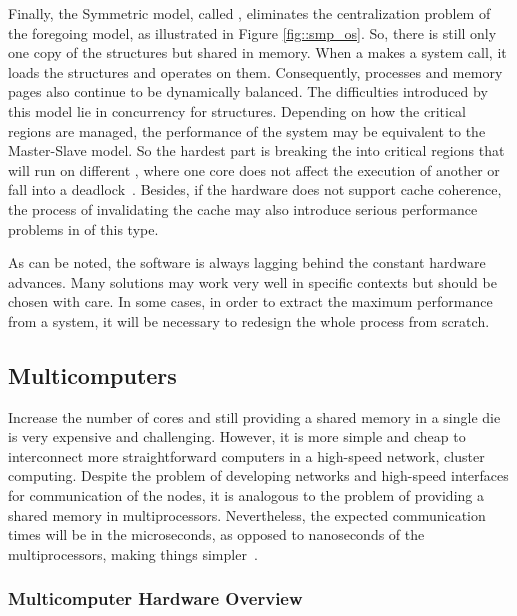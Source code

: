 			Finally, the Symmetric model, called \smp, eliminates the centralization
			problem of the foregoing model, as illustrated in Figure \ref{fig::smp_os}.
			So, there is still only one copy of the \os structures but shared in memory.
			When a \cpu makes a system call, it loads the structures and operates on them.
			Consequently, processes and memory pages also continue to be dynamically balanced.
			The difficulties introduced by this model lie in concurrency for \os structures.
			Depending on how the critical regions are managed, the performance of the system
			may be equivalent to the Master-Slave model. So the hardest part is breaking the
			\os into critical regions that will run on different \cpus, where one core does
			not affect the execution of another or fall into a deadlock~\cite{tanenbaum:4ed}.
			Besides, if the hardware does not support cache coherence, the process of
			invalidating the cache may also introduce serious performance problems in \oses of this type.

			As can be noted, the software is always lagging behind the constant hardware advances.
			Many solutions may work very well in specific contexts but should be chosen with care.
			In some cases, in order to extract the maximum performance from a system, it will be
			necessary to redesign the whole process from scratch.

	\subsection{Multicomputers}
	\label{sec::multicomputers}

		Increase the number of cores and still providing a shared memory in a
		single die is very expensive and challenging.
		However, it is more simple and cheap to interconnect more straightforward
		computers in a high-speed network, \eg cluster computing.
		Despite the problem of developing networks and high-speed interfaces
		for communication of the nodes, it is analogous to the problem of
		providing a shared memory in multiprocessors.
		Nevertheless, the expected communication times will be in the
		microseconds, as opposed to nanoseconds of the multiprocessors,
		making things simpler~\cite{tanenbaum:4ed}.

			\subsubsection{Multicomputer Hardware Overview}
			\label{sec::multicomputers_hw}

